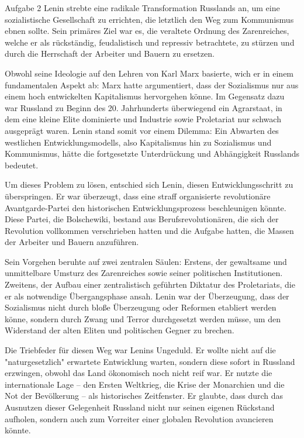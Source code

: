\documentclass[11pt,a4paper,oneside]{article}
\begin{document}
	
	\begin{histloesung}{Aufgabe 2}
		Lenin strebte eine radikale Transformation Russlands an, um eine sozialistische Gesellschaft zu errichten, die letztlich den Weg zum Kommunismus ebnen sollte. Sein primäres Ziel war es, die veraltete Ordnung des Zarenreiches, welche er als rückständig, feudalistisch und repressiv betrachtete, zu stürzen und durch die Herrschaft der Arbeiter und Bauern zu ersetzen.
		
		Obwohl seine Ideologie auf den Lehren von Karl Marx basierte, wich er in einem fundamentalen Aspekt ab: Marx hatte argumentiert, dass der Sozialismus nur aus einem hoch entwickelten Kapitalismus hervorgehen könne. Im Gegensatz dazu war Russland zu Beginn des 20. Jahrhunderts überwiegend ein Agrarstaat, in dem eine kleine Elite dominierte und Industrie sowie Proletariat nur schwach ausgeprägt waren. Lenin stand somit vor einem Dilemma: Ein Abwarten des westlichen Entwicklungsmodells, also Kapitalismus hin zu Sozialismus und Kommunismus, hätte die fortgesetzte Unterdrückung und Abhängigkeit Russlands bedeutet.
		
		Um dieses Problem zu lösen, entschied sich Lenin, diesen Entwicklungsschritt zu überspringen. Er war überzeugt, dass eine straff organisierte revolutionäre Avantgarde-Partei den historischen Entwicklungsprozess beschleunigen könnte. Diese Partei, die Bolschewiki, bestand aus Berufsrevolutionären, die sich der Revolution vollkommen verschrieben hatten und die Aufgabe hatten, die Massen der Arbeiter und Bauern anzuführen.
		
		Sein Vorgehen beruhte auf zwei zentralen Säulen: Erstens, der gewaltsame und unmittelbare Umsturz des Zarenreiches sowie seiner politischen Institutionen. Zweitens, der Aufbau einer zentralistisch geführten Diktatur des Proletariats, die er als notwendige Übergangsphase ansah. Lenin war der Überzeugung, dass der Sozialismus nicht durch bloße Überzeugung oder Reformen etabliert werden könne, sondern durch Zwang und Terror durchgesetzt werden müsse, um den Widerstand der alten Eliten und politischen Gegner zu brechen.
		
		Die Triebfeder für diesen Weg war Lenins Ungeduld. Er wollte nicht auf die "naturgesetzlich" erwartete Entwicklung warten, sondern diese sofort in Russland erzwingen, obwohl das Land ökonomisch noch nicht reif war. Er nutzte die internationale Lage – den Ersten Weltkrieg, die Krise der Monarchien und die Not der Bevölkerung – als historisches Zeitfenster. Er glaubte, dass durch das Ausnutzen dieser Gelegenheit Russland nicht nur seinen eigenen Rückstand aufholen, sondern auch zum Vorreiter einer globalen Revolution avancieren könnte.
	\end{histloesung}
	
\end{document}
